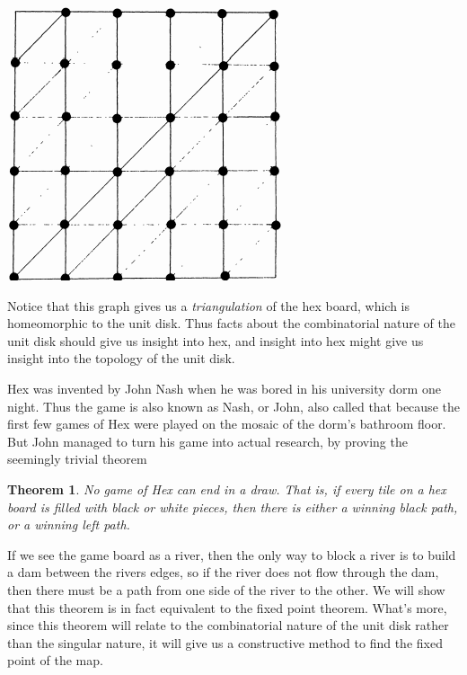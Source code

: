 \documentclass{article}
\theoremstyle{plain}
\newtheorem{theorem}{Theorem}
\begin{document}
\begin{center}
\includegraphics[scale=0.4]{lattice}
\end{center}

Notice that this graph gives us a {\it triangulation} of the hex board, which is homeomorphic to the unit disk. Thus facts about the combinatorial nature of the unit disk should give us insight into hex, and insight into hex might give us insight into the topology of the unit disk.

Hex was invented by John Nash when he was bored in his university dorm one night. Thus the game is also known as Nash, or John, also called that because the first few games of Hex were played on the mosaic of the dorm's bathroom floor. But John managed to turn his game into actual research, by proving the seemingly trivial theorem

\begin{theorem}
    No game of Hex can end in a draw. That is, if every tile on a hex board is filled with black or white pieces, then there is either a winning black path, or a winning left path.
\end{theorem}

If we see the game board as a river, then the only way to block a river is to build a dam between the rivers edges, so if the river does not flow through the dam, then there must be a path from one side of the river to the other. We will show that this theorem is in fact equivalent to the fixed point theorem. What's more, since this theorem will relate to the combinatorial nature of the unit disk rather than the singular nature, it will give us a constructive method to find the fixed point of the map.
\end{document}
